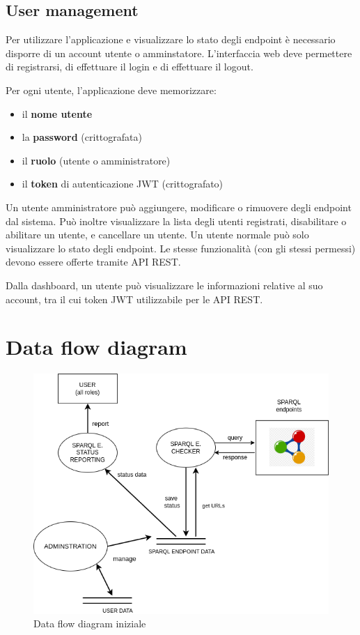 \documentclass{article}
\begin{document}
\subsection{User management}

Per utilizzare l'applicazione e visualizzare lo stato degli endpoint è necessario disporre di un account utente o amminstatore.
L'interfaccia web deve permettere di registrarsi, di effettuare il login e di effettuare il logout.

Per ogni utente, l'applicazione deve memorizzare:
\begin{itemize}
    \item il \textbf{nome utente}
    \item la \textbf{password} (crittografata)
    \item il \textbf{ruolo} (utente o amministratore)
    \item il \textbf{token} di autenticazione JWT (crittografato)
\end{itemize}

Un utente amministratore può aggiungere, modificare o rimuovere degli endpoint dal sistema.
Può inoltre visualizzare la lista degli utenti registrati, disabilitare o abilitare un utente, e cancellare un utente.
Un utente normale può solo visualizzare lo stato degli endpoint.
Le stesse funzionalità (con gli stessi permessi) devono essere offerte tramite API REST.

Dalla dashboard, un utente può visualizzare le informazioni relative al suo account, tra il cui token JWT utilizzabile per le API REST.

\clearpage
\section{Data flow diagram}
\label{sec:data-flow-diagram}

\begin{figure}[h]
    \centering
    \includegraphics[width=1\textwidth]{dfd_sparql.png}
    \caption{Data flow diagram iniziale}
\end{figure}
\end{document}
